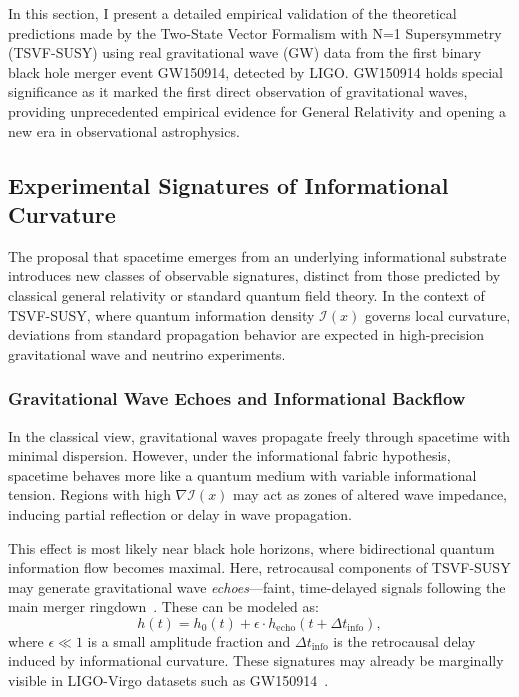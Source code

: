 \documentclass[twocolumn,superscriptaddress,floatfix]{revtex4-2}
\begin{document}
In this section, I present a detailed empirical validation of the theoretical predictions made by the Two-State Vector Formalism with N=1 Supersymmetry (TSVF-SUSY) using real gravitational wave (GW) data from the first binary black hole merger event GW150914, detected by LIGO. GW150914 holds special significance as it marked the first direct observation of gravitational waves, providing unprecedented empirical evidence for General Relativity and opening a new era in observational astrophysics.

\subsection{Experimental Signatures of Informational Curvature}
\label{sec:infosignatures}

The proposal that spacetime emerges from an underlying informational substrate introduces new classes of observable signatures, distinct from those predicted by classical general relativity or standard quantum field theory. In the context of TSVF-SUSY, where quantum information density $\mathcal{I}(x)$ governs local curvature, deviations from standard propagation behavior are expected in high-precision gravitational wave and neutrino experiments.

\subsubsection{Gravitational Wave Echoes and Informational Backflow}

In the classical view, gravitational waves propagate freely through spacetime with minimal dispersion. However, under the informational fabric hypothesis, spacetime behaves more like a quantum medium with variable informational tension. Regions with high $\nabla \mathcal{I}(x)$ may act as zones of altered wave impedance, inducing partial reflection or delay in wave propagation.

This effect is most likely near black hole horizons, where bidirectional quantum information flow becomes maximal. Here, retrocausal components of TSVF-SUSY may generate gravitational wave \emph{echoes}—faint, time-delayed signals following the main merger ringdown~\cite{Cardoso2016, Conklin2018}. These can be modeled as:
\begin{equation}
h(t) = h_0(t) + \epsilon \cdot h_{\text{echo}}(t + \Delta t_{\text{info}}),
\label{eq:waveecho}
\end{equation}
where $\epsilon \ll 1$ is a small amplitude fraction and $\Delta t_{\text{info}}$ is the retrocausal delay induced by informational curvature. These signatures may already be marginally visible in LIGO-Virgo datasets such as GW150914~\cite{Abedi2017, Westerweck2018}.
\end{document}
